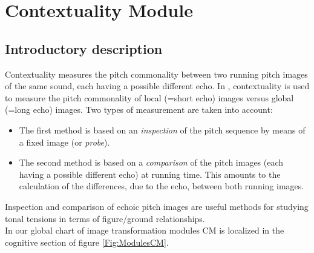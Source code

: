 \newpage
\section{Contextuality Module}

\hypertarget{Concepts:ContextualityModule}{}

\hypertarget{Concepts:IPEMContextualityIndex}{}

\subsection{Introductory description}

Contextuality measures the pitch commonality between two running
pitch images of the same sound, each having a possible different
echo. In , contextuality
is used to measure the pitch commonality of local (=short echo)
images versus global (=long echo) images. Two types of measurement
are taken into account:
\begin{itemize}
\item
    The first method is based on an \emph{inspection} of the pitch sequence by
    means of a fixed image (or \emph{probe}).
\item
    The second method is based on a \emph{comparison} of the pitch images (each
    having a possible different echo) at running time. This amounts to the
    calculation of the differences, due to the echo, between both running images.
\end{itemize}
Inspection and comparison of echoic pitch images are useful
methods for studying tonal tensions in terms of figure/ground
relationships.\\ In our global chart of image transformation
modules CM is localized in the cognitive section of figure
\ref{Fig:ModulesCM}.

